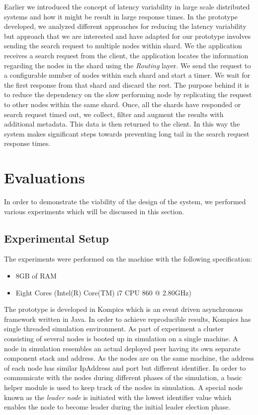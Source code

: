 \documentclass[a4paper,11pt]{kth-mag}
\begin{document}
Earlier we introduced the concept of latency variability in large scale distributed systems and how it might be result in large response times. In the prototype developed, we analyzed different approaches for reducing the latency variability but
approach that we are interested and have adapted for our prototype involves sending the search request to multiple nodes within shard. We the application receives a search request from the client, the application locates the information regarding the nodes in the shard using the \textit{Routing} layer. We send the request to a configurable number of nodes within each shard and start a timer. We wait for the first response from that shard and discard the rest. The purpose behind it is to reduce the dependency on the slow performing node by replicating the request to other nodes within the same shard. Once, all the shards have responded or search request timed out, we collect, filter and augment the results with additional metadata. This data is then returned to the client. In this way the system makes significant steps towards preventing long tail in the search request response times.






\chapter{Evaluations}
\label{chap:eval}

In order to demonstrate the viability of the design of the system, we performed various experiments which will be discussed in this section.


\section{Experimental Setup}

The experiments were performed on the machine with the following specification:

\begin{itemize}
\item 8GB of RAM
\item Eight Cores (Intel(R) Core(TM) i7 CPU 860  @ 2.80GHz)
\end{itemize}

The prototype is developed in Kompics which is an event driven asynchronous framework written in Java. In order to achieve reproducible results, Kompics has single threaded simulation environment. As part of experiment a cluster consisting of several nodes is booted up in simulation on a single machine. A node in simulation resembles an actual deployed peer having its own separate component stack and address. As the nodes are on the same machine, the address of each node has similar IpAddress and port but different identifier. In order to communicate with the nodes during different phases of the simulation, a basic helper module is used to keep track of the nodes in simulation. A special node known as the \textit{leader node} is initiated with the lowest identifier value which enables the node to become leader during the initial leader election phase.
\end{document}
